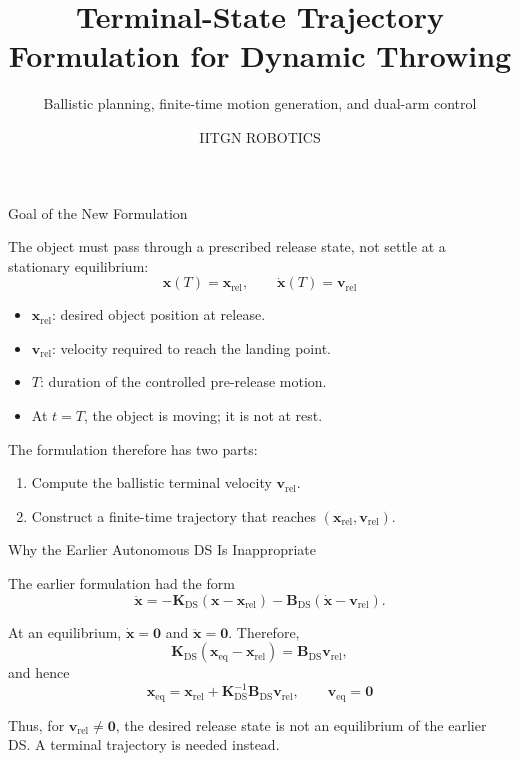 \documentclass[aspectratio=169]{beamer}
\title{Terminal-State Trajectory Formulation for Dynamic Throwing}
\subtitle{Ballistic planning, finite-time motion generation, and dual-arm control}
\author{IITGN ROBOTICS}
\institute{IIT Gandhinagar}
\newcommand{\vect}[1]{\bm{#1}}
\begin{document}
\begin{frame}
    \titlepage
\end{frame}

\begin{frame}{Goal of the New Formulation}

The object must pass through a prescribed release state,
not settle at a stationary equilibrium:
\[
\boxed{
\vect{x}(T)=\vect{x}_{\mathrm{rel}},
\qquad
\dot{\vect{x}}(T)=\vect{v}_{\mathrm{rel}}
}
\]

\begin{itemize}
    \item $\vect{x}_{\mathrm{rel}}$: desired object position at release.
    \item $\vect{v}_{\mathrm{rel}}$: velocity required to reach the landing point.
    \item $T$: duration of the controlled pre-release motion.
    \item At $t=T$, the object is moving; it is not at rest.
\end{itemize}

The formulation therefore has two parts:
\begin{enumerate}
    \item Compute the ballistic terminal velocity $\vect{v}_{\mathrm{rel}}$.
    \item Construct a finite-time trajectory that reaches
    $(\vect{x}_{\mathrm{rel}},\vect{v}_{\mathrm{rel}})$.
\end{enumerate}

\end{frame}

\begin{frame}{Why the Earlier Autonomous DS Is Inappropriate}

The earlier formulation had the form
\[
\ddot{\vect{x}}
=-\vect{K}_{\mathrm{DS}}(\vect{x}-\vect{x}_{\mathrm{rel}})
-\vect{B}_{\mathrm{DS}}(\dot{\vect{x}}-\vect{v}_{\mathrm{rel}}).
\]

At an equilibrium, $\dot{\vect{x}}=\vect{0}$ and
$\ddot{\vect{x}}=\vect{0}$. Therefore,
\[
\vect{K}_{\mathrm{DS}}(\vect{x}_{\mathrm{eq}}-\vect{x}_{\mathrm{rel}})
=\vect{B}_{\mathrm{DS}}\vect{v}_{\mathrm{rel}},
\]
and hence
\[
\boxed{
\vect{x}_{\mathrm{eq}}
=\vect{x}_{\mathrm{rel}}
+\vect{K}_{\mathrm{DS}}^{-1}\vect{B}_{\mathrm{DS}}
\vect{v}_{\mathrm{rel}},
\qquad
\vect{v}_{\mathrm{eq}}=\vect{0}
}
\]

Thus, for $\vect{v}_{\mathrm{rel}}\neq\vect{0}$, the desired release
state is not an equilibrium of the earlier DS. A terminal trajectory is
needed instead.

\end{frame}
\end{document}

